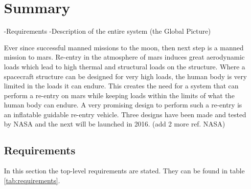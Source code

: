 \section*{Summary}\label{cha:summary}%
-Requirements
-Description of the entire system (the Global Picture)

Ever since successful manned missions to the moon, then next step is a manned mission to mars. Re-entry in the atmosphere of mars induces great aerodynamic loads which lead to high thermal and structural loads on the structure. Where a spacecraft structure can be designed for very high loads, the human body is very limited in the loads it can endure. This creates the need for a system that can perform a re-entry on mars while keeping loads within the limits of what the human body can endure. A very promising design to perform such a re-entry is an inflatable guidable re-entry vehicle. Three designs have been made and tested by NASA and the next will be launched in 2016. \cite{irve2}(add 2 more ref. NASA) 

\subsection{Requirements}
In this section the top-level requirements are stated. They can be found in table \ref{tab:requirements}.

